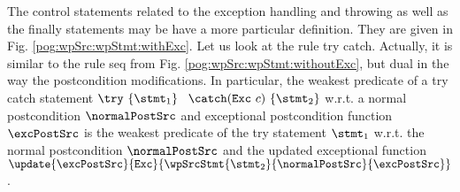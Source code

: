 The control statements related to the exception handling and throwing as well as the finally statements
may be have a more particular definition. They are given in Fig. \ref{pog:wpSrc:wpStmt:withExc}. 
Let us look at the rule \textsf{try catch}. Actually, it is similar to the  rule  \textsf{seq} from 
Fig. \ref{pog:wpSrc:wpStmt:withoutExc}, but dual in the way the postcondition modifications. In particular, 
the weakest predicate of a try catch statement $ \try \ \{ \stmt_1 \} \ $ 
$\catch (  \mbox{\rm\texttt{Exc}} \ c )\ \{ \stmt_2 \} $  w.r.t. a normal postcondition   $\normalPostSrc$  and exceptional postcondition function $ \excPostSrc$
is the weakest predicate of the try statement $\stmt_1$ w.r.t. the normal postcondition  $\normalPostSrc$  and the updated exceptional function
$\update{\excPostSrc}{ \mbox{\rm\texttt{Exc}} }{\wpSrcStmt{\stmt_2}{ \normalPostSrc}{\excPostSrc} }$.
